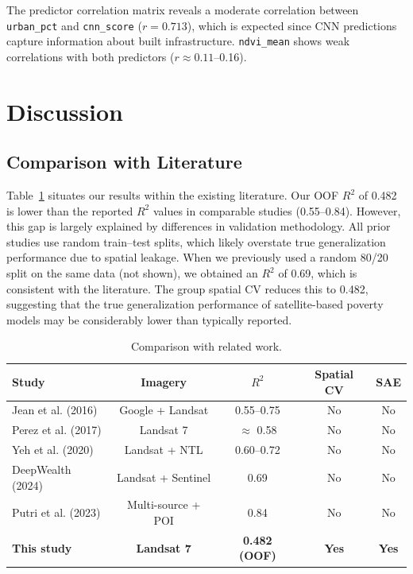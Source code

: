\documentclass[11pt,a4paper]{article}
\newcommand{\Rtwo}{\ensuremath{R^2}}
\begin{document}
The predictor correlation matrix reveals a moderate correlation between \texttt{urban\_pct} and \texttt{cnn\_score} ($r = 0.713$), which is expected since CNN predictions capture information about built infrastructure. \texttt{ndvi\_mean} shows weak correlations with both predictors ($r \approx 0.11$--0.16).

\section{Discussion}
\label{sec:discussion}

\subsection{Comparison with Literature}

Table~\ref{tab:lit_comparison} situates our results within the existing literature. Our OOF \Rtwo{} of 0.482 is lower than the reported \Rtwo{} values in comparable studies (0.55--0.84). However, this gap is largely explained by differences in validation methodology. All prior studies use random train--test splits, which likely overstate true generalization performance due to spatial leakage. When we previously used a random 80/20 split on the same data (not shown), we obtained an \Rtwo{} of 0.69, which is consistent with the literature. The group spatial CV reduces this to 0.482, suggesting that the true generalization performance of satellite-based poverty models may be considerably lower than typically reported.

\begin{table}[ht]
\centering
\caption{Comparison with related work.}
\label{tab:lit_comparison}
\begin{tabular}{lcccc}
\toprule
Study & Imagery & \Rtwo{} & Spatial CV & SAE \\
\midrule
Jean et al. (2016) & Google + Landsat & 0.55--0.75 & No & No \\
Perez et al. (2017) & Landsat 7 & $\approx$ 0.58 & No & No \\
Yeh et al. (2020) & Landsat + NTL & 0.60--0.72 & No & No \\
DeepWealth (2024) & Landsat + Sentinel & 0.69 & No & No \\
Putri et al. (2023) & Multi-source + POI & 0.84 & No & No \\
\rowcolor{gray!15}
\textbf{This study} & \textbf{Landsat 7} & \textbf{0.482 (OOF)} & \textbf{Yes} & \textbf{Yes} \\
\bottomrule
\end{tabular}
\end{table}
\end{document}
